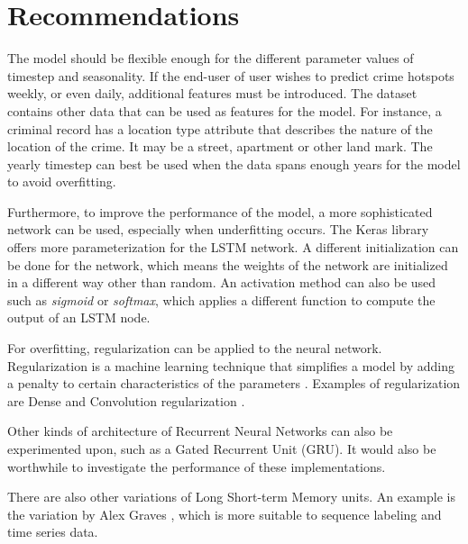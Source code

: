 \section{Recommendations}
    The model should be flexible enough for the different parameter values of timestep and seasonality. If the end-user of user wishes to predict crime hotspots weekly, or even daily, additional features must be introduced. The dataset contains other data that can be used as features for the model. For instance, a criminal record has a location type attribute that describes the nature of the location of the crime. It may be a street, apartment or other land mark. The yearly timestep can best be used when the data spans enough years for the model to avoid overfitting.

    Furthermore, to improve the performance of the model, a more sophisticated network can be used, especially when underfitting occurs. The Keras library offers more parameterization for the LSTM network. A different initialization can be done for the network, which means the weights of the network are initialized in a different way other than random. An activation method can also be used such as \textit{sigmoid} or \textit{softmax}, which applies a different function to compute the output of an LSTM node.

    For overfitting, regularization can be applied to the neural network. Regularization is a machine learning technique that simplifies a model by adding a penalty to certain characteristics of the parameters \citep{scikit-learn}. Examples of regularization are Dense and Convolution regularization \citep{chollet2015keras}.

    Other kinds of architecture of Recurrent Neural Networks can also be experimented upon, such as a Gated Recurrent Unit (GRU). It would also be worthwhile to investigate the performance of these implementations.

    There are also other variations of Long Short-term Memory units. An example is the variation by Alex Graves \citeyearpar{graves2013generating}, which is more suitable to sequence labeling and time series data.